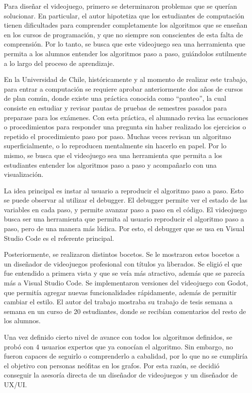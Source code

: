 Para diseñar el videojuego, primero se determinaron problemas que se querían solucionar. En particular, el autor hipotetiza que los estudiantes de computación tienen dificultades para comprender completamente los algoritmos que se enseñan en los cursos de programación, y que no siempre son conscientes de esta falta de comprensión. Por lo tanto, se busca que este videojuego sea una herramienta que permita a los alumnos entender los algoritmos paso a paso, guiándolos sutilmente a lo largo del proceso de aprendizaje.

En la Universidad de Chile, históricamente y al momento de realizar este trabajo, para entrar a computación se requiere aprobar anteriormente dos años de cursos de plan común, donde existe una práctica conocida como ``pauteo'', la cual consiste en estudiar y revisar pautas de pruebas de semestres pasados para preparase para los exámenes. Con esta práctica, el alumnado revisa las ecuaciones o procedimientos para responder una pregunta sin haber realizado los ejercicios o repetido el procedimiento paso por paso. Muchas veces revisan un algoritmo superficialmente, o lo reproducen mentalmente sin hacerlo en papel. Por lo mismo, se busca que el videojuego sea una herramienta que permita a los estudiantes entender los algoritmos paso a paso y acompañarlo con una visualización.

La idea principal es instar al usuario a reproducir el algoritmo paso a paso. Esto se puede observar al utilizar el debugger. El debugger permite ver el estado de las variables en cada paso, y permite avanzar paso a paso en el código. El videojuego busca ser una herramienta que permita al usuario reproducir el algoritmo paso a paso, pero de una manera más lúdica. Por esto, el debugger que se usa en Visual Studio Code es el referente principal.


Posteriormente, se realizaron distintos bocetos. Se le mostraron estos bocetos a un diseñador de videojuegos profesional con títulos ya liberados. Se eligió el que fue entendido a primera vista y que se veía más atractivo, además que se parecía más a Visual Studio Code. Se implementaron versiones del videojuego con Godot, que permitía agregar nuevas funcionalidades rápidamente, además de permitir cambiar el estilo. El autor del trabajo mostraba su trabajo de tesis semana a semana en un curso de 20 estudiantes, donde se recibían comentarios del resto de los alumnos.

Una vez definido cierto nivel de avance con todos los algoritmos definidos, se probó con 4 usuarios expertos que ya conocían el algoritmo. Sin embargo, no fueron capaces de seguirlo o comprenderlo a cabalidad, por lo que no se cumpliría el objetivo con personas neófitas en los grafos. Por esta razón, se decidió conseguir la asesoría directa de un diseñador de videojuegos y un diseñador de UX/UI.

